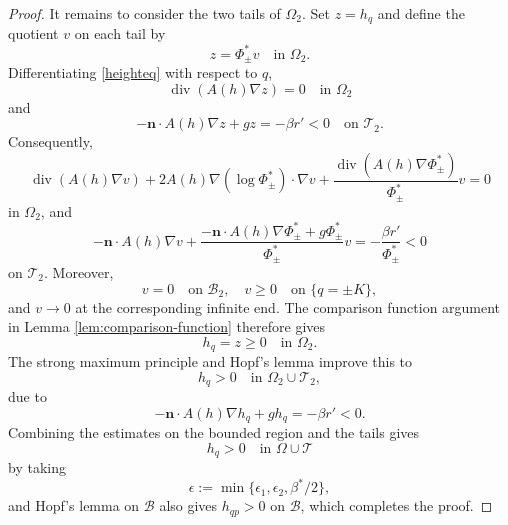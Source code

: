 \documentclass[12pt,letterpaper]{amsart}
\numberwithin{equation}{section}
\begin{document}
\begin{proof}
		{It remains to consider the two tails of $\Omega_2$. Set $z=h_q$ and define the quotient $v$ on each tail by}
		\[ z = \Phi_{\pm}^* v \quad \text{in } \Omega_2. \]
		{Differentiating \eqref{heighteq} with respect to $q$,}
		\[ \operatorname{div}(A(h)\nabla z) = 0 \quad \text{in } \Omega_2 \]
		and
		\[ {-\mathbf n\cdot} A(h)\nabla z + gz = -\beta r' < 0 \quad \text{on } \mathcal T_2. \]
		Consequently,
		\[
		\operatorname{div}(A(h)\nabla v) + 2A(h)\nabla(\log \Phi_{\pm}^*) \cdot \nabla v
		+ \frac{\operatorname{div}(A(h)\nabla \Phi_{\pm}^*)}{\Phi_{\pm}^*}v = 0
		\]
		in \(\Omega_2\), and
		\[
		{-\mathbf n\cdot} A(h)\nabla v
		+ \frac{{-\mathbf n\cdot} A(h)\nabla \Phi_{\pm}^* + g \Phi_{\pm}^*}{ \Phi_{\pm}^*}v
		= -\frac{\beta r'}{ \Phi_{\pm}^*} < 0
		\]
		on \(\mathcal T_2\).
		Moreover,
		\[
		v = 0 \quad {\text{on }\mathcal B_2}, \quad v \geq 0 \quad \text{on } \{q = \pm K\},
		\]
		and \(v \to 0\) at the corresponding infinite end. The comparison function argument in Lemma \ref{lem:comparison-function} therefore gives
		\[
		h_q = z \geq 0 \quad \text{in } \Omega_2.
		\]
		{The strong maximum principle and Hopf's lemma improve this to}
		\[
		h_q > 0 \quad \text{in } \Omega_2 \cup \mathcal T_2,
		\]
		due to
		\[
		{-\mathbf n\cdot} A(h)\nabla h_q + gh_q = -\beta r' < 0.
		\]
		{Combining the estimates on the bounded region and the tails gives}
		\[
		h_q > 0 \quad \text{in } \Omega \cup \mathcal T
		\]
		by taking
		\[
		\epsilon := \min\{\epsilon_1, \epsilon_2, \beta^* / 2\},
		\]
		{and Hopf's lemma on $\mathcal B$ also gives} $h_{qp}>0$ on $\mathcal B$,
		 which completes the proof.
		\end{proof}
		
\end{document}
